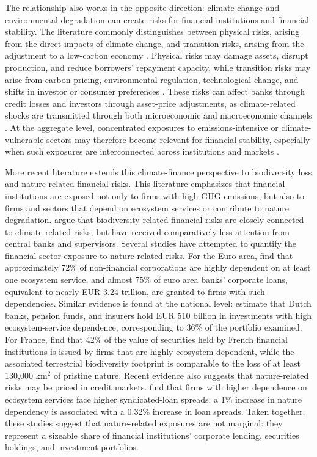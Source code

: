 The relationship also works in the opposite direction: climate change and environmental degradation can create risks for financial institutions and financial stability. The literature commonly distinguishes between physical risks, arising from the direct impacts of climate change, and transition risks, arising from the adjustment to a low-carbon economy \citep{bolton_green_2020, ngfs_call_2019}. Physical risks may damage assets, disrupt production, and reduce borrowers' repayment capacity, while transition risks may arise from carbon pricing, environmental regulation, technological change, and shifts in investor or consumer preferences \citep{ecb_financial_2021}. These risks can affect banks through credit losses and investors through asset-price adjustments, as climate-related shocks are transmitted through both microeconomic and macroeconomic channels \citep{bcbs_climate-related_2021, ecb_financial_2021}. At the aggregate level, concentrated exposures to emissions-intensive or climate-vulnerable sectors may therefore become relevant for financial stability, especially when such exposures are interconnected across institutions and markets \citep{battiston_climate_2017, ecb_financial_2021}.

More recent literature extends this climate-finance perspective to biodiversity loss and nature-related financial risks. This literature emphasizes that financial institutions are exposed not only to firms with high GHG emissions, but also to firms and sectors that depend on ecosystem services or contribute to nature degradation. \textcite{kedward_biodiversity_2023} argue that biodiversity-related financial risks are closely connected to climate-related risks, but have received comparatively less attention from central banks and supervisors. Several studies have attempted to quantify the financial-sector exposure to nature-related risks. For the Euro area, \textcite{boldrini_living_2023} find that approximately 72\% of non-financial corporations are highly dependent on at least one ecosystem service, and  almost 75\% of euro area banks' corporate loans, equivalent to nearly EUR 3.24 trillion, are granted to firms with such dependencies. Similar evidence is found at the national level: \textcite{van_toor_indebted_2020} estimate that Dutch banks, pension funds, and insurers hold EUR 510 billion in investments with high ecosystem-service dependence, corresponding to 36\% of the portfolio examined. For France, \textcite{svartzman_silent_2021} find that 42\% of the value of securities held by French financial institutions is issued by firms that are highly ecosystem-dependent, while the associated terrestrial biodiversity footprint is comparable to the loss of at least 130,000 km$^2$ of pristine nature. Recent evidence also suggests that nature-related risks may be priced in credit markets. \textcite{canipek_nature-related_2025} find that firms with higher dependence on ecosystem services face higher syndicated-loan spreads: a 1\% increase in nature dependency is associated with a 0.32\% increase in loan spreads. Taken together, these studies suggest that nature-related exposures are not marginal: they represent a sizeable share of financial institutions’ corporate lending, securities holdings, and investment portfolios.

